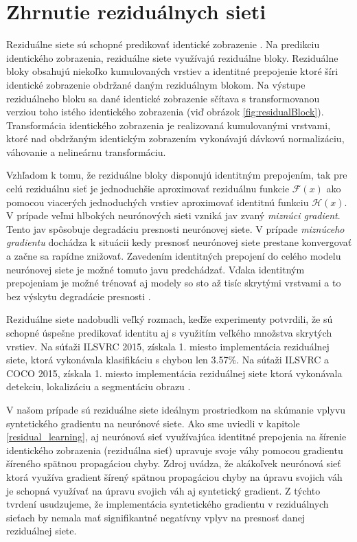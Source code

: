 \section{Zhrnutie reziduálnych sieti}
\label{conclusionResNet}

Reziduálne siete sú schopné predikovať identické zobrazenie \cite{Wu2017, He2016, Targ2016}. Na predikciu identického zobrazenia, reziduálne siete využívajú reziduálne bloky. Reziduálne bloky obsahujú niekoľko kumulovaných vrstiev a identitné prepojenie ktoré šíri identické zobrazenie obdržané daným reziduálnym blokom. Na výstupe reziduálneho bloku sa dané identické zobrazenie sčítava s transformovanou verziou toho istého identického zobrazenia (viď obrázok \ref{fig:residualBlock}). Transformácia identického zobrazenia je realizovaná kumulovanými vrstvami, ktoré nad obdržaným identickým zobrazením vykonávajú dávkovú normalizáciu, váhovanie a nelineárnu transformáciu.

Vzhľadom k tomu, že reziduálne bloky disponujú identitným prepojením, tak pre celú reziduálnu sieť je jednoduchšie aproximovať reziduálnu funkcie $\mathcal{F}(x)$ ako pomocou viacerých jednoduchých vrstiev aproximovať identitnú funkciu $\mathcal{H}(x)$. V prípade veľmi hlbokých neurónových sieti vzniká jav zvaný \textit{miznúci gradient}. Tento jav spôsobuje degradáciu presnosti neurónovej siete. V prípade \textit{miznúceho gradientu} dochádza k situácii kedy presnosť neurónovej siete prestane konvergovať a začne sa rapídne znižovať. Zavedením identitných prepojení do celého modelu neurónovej siete je možné tomuto javu predchádzať. Vďaka identitným prepojeniam je možné trénovať aj modely so sto až tisíc skrytými vrstvami a to bez výskytu degradácie presnosti \cite{Wu2017}.

Reziduálne siete nadobudli veľký rozmach, keďže experimenty potvrdili, že sú schopné úspešne predikovať identitu aj s využitím veľkého množstva skrytých vrstiev. Na súťaži ILSVRC 2015, získala 1. miesto implementácia reziduálnej siete, ktorá vykonávala klasifikáciu s chybou len 3.57\%. Na súťaži ILSVRC a COCO 2015, získala 1. miesto implementácia reziduálnej siete ktorá vykonávala detekciu, lokalizáciu a segmentáciu obrazu \cite{Wu2017}.

V našom prípade sú reziduálne siete ideálnym prostriedkom na skúmanie vplyvu syntetického gradientu na neurónové siete. Ako sme uviedli v kapitole \ref{residual_learning}, aj neurónová sieť využívajúca identitné prepojenia na šírenie identického zobrazenia (reziduálna sieť) upravuje svoje váhy pomocou gradientu šíreného spätnou propagáciou chyby. Zdroj \cite{Jaderberg2016} uvádza, že akákoľvek neurónová sieť ktorá využíva gradient šírený spätnou propagáciou chyby na úpravu svojich váh je schopná využívať na úpravu svojich váh aj syntetický gradient. Z týchto tvrdení usudzujeme, že implementácia syntetického gradientu v reziduálnych sieťach by nemala mať signifikantné negatívny vplyv na presnosť danej reziduálnej siete.